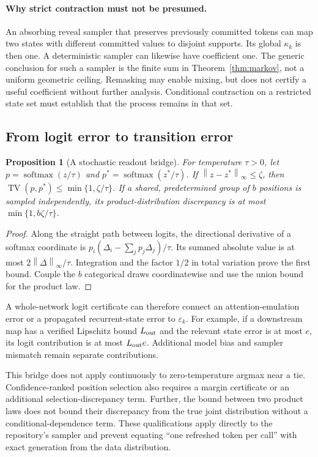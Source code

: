\documentclass{article}
\newtheorem{proposition}[theorem]{Proposition}
\theoremstyle{remark}\newtheorem{remark}[theorem]{Remark}
\newcommand{\TV}{\operatorname{TV}}
\newcommand{\norm}[1]{\left\lVert #1\right\rVert}
\begin{document}
\paragraph{Why strict contraction must not be presumed.}
An absorbing reveal sampler that preserves previously committed tokens can map two states with different committed values to disjoint supports. Its global $\kappa_k$ is then one. A deterministic sampler can likewise have coefficient one. The generic conclusion for such a sampler is the finite sum in Theorem~\ref{thm:markov}, not a uniform geometric ceiling. Remasking may enable mixing, but does not certify a useful coefficient without further analysis. Conditional contraction on a restricted state set must establish that the process remains in that set.

\subsection{From logit error to transition error}
\begin{proposition}[A stochastic readout bridge]
\label{prop:softmax}
For temperature $\tau>0$, let $p=\operatorname{softmax}(z/\tau)$ and $p^*=\operatorname{softmax}(z^*/\tau)$. If $\norm{z-z^*}_\infty\le\zeta$, then $\TV(p,p^*)\le\min\{1,\zeta/\tau\}$. If a shared, predetermined group of $b$ positions is sampled independently, its product-distribution discrepancy is at most $\min\{1,b\zeta/\tau\}$.
\end{proposition}
\begin{proof}
Along the straight path between logits, the directional derivative of a softmax coordinate is
$p_i(\Delta_i-\sum_jp_j\Delta_j)/\tau$.
Its summed absolute value is at most $2\norm{\Delta}_\infty/\tau$. Integration and the factor $1/2$ in total variation prove the first bound. Couple the $b$ categorical draws coordinatewise and use the union bound for the product law.
\end{proof}

A whole-network logit certificate can therefore connect an attention-emulation error or a propagated recurrent-state error to $\varepsilon_k$. For example, if a downstream map has a verified Lipschitz bound $L_{\rm out}$ and the relevant state error is at most $e$, its logit contribution is at most $L_{\rm out}e$. Additional model bias and sampler mismatch remain separate contributions.

This bridge does not apply continuously to zero-temperature argmax near a tie. Confidence-ranked position selection also requires a margin certificate or an additional selection-discrepancy term. Further, the bound between two product laws does not bound their discrepancy from the true joint distribution without a conditional-dependence term. These qualifications apply directly to the repository's sampler and prevent equating ``one refreshed token per call'' with exact generation from the data distribution.
\end{document}

